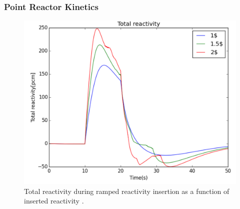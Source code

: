 \begin{frame}
        \frametitle{Point Reactor Kinetics}

               \begin{figure}[t]
                \vspace*{-0.1in}
                       \includegraphics[height=0.5\textwidth]{./images/pbfhr-total-reactivity.png}
                       \caption{Total reactivity during ramped reactivity 
                       insertion as a function of inserted reactivity
                       \cite{wang_coupled_2016}.}
               \end{figure}

\end{frame}



